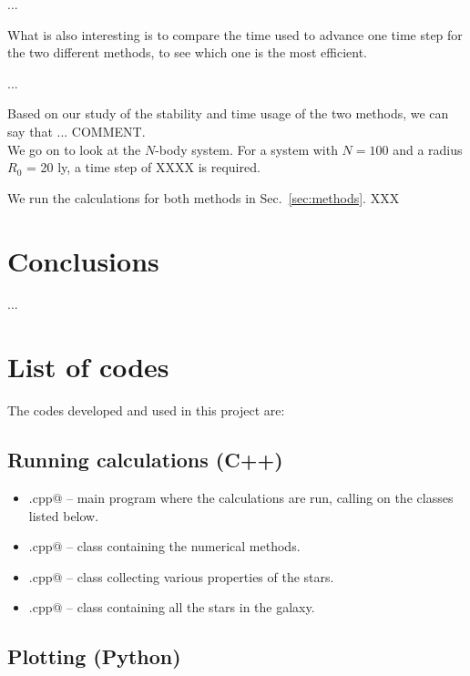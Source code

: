 \documentclass{article}
\begin{document}
\begin{multicols}{2}
...

What is also interesting is to compare the time used to advance one time step for the two different methods, to see which one is the most efficient.

...

Based on our study of the stability and time usage of the two methods, we can say that ... COMMENT. \\







\noindent We go on to look at the $N$-body system. For a system with $N = 100$ and a radius $R_0$ = 20 ly, a time step of XXXX is required.

We run the calculations for both methods in Sec.~\ref{sec:methods}. XXX





\section{Conclusions}

...




\section{List of codes}

The codes developed and used in this project are: 


\subsection{Running calculations (C++)}

\begin{itemize}
	\item \verb@main.cpp@ -- main program where the calculations are run, calling on the classes listed below. 
	\item \verb@solver.cpp@ -- class containing the numerical methods.
	\item \verb@star.cpp@ -- class collecting various properties of the stars.
	\item \verb@galaxy.cpp@ -- class containing all the stars in the galaxy.
\end{itemize}


\subsection{Plotting (Python)}


\end{multicols}
\end{document}
